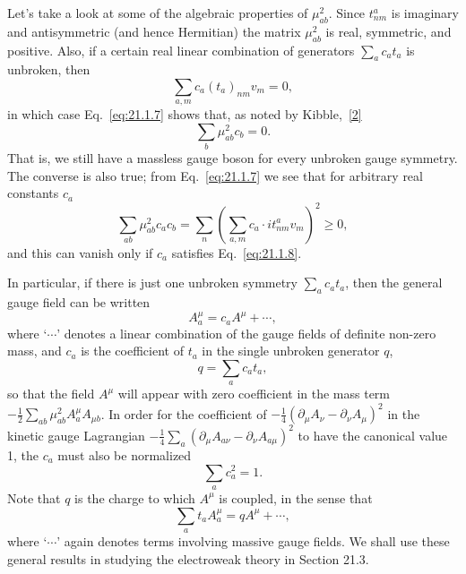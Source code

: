 Let's take a look at some of the algebraic properties of
$\mu^2_{ab}$. Since $t^a_{nm}$ is imaginary and antisymmetric
(and hence Hermitian) the matrix $\mu^2_{ab}$ is real, symmetric,
and positive. Also, if a certain real linear combination of generators
$\sum_a c_a t_a$ is unbroken, then
\begin{equation}
 \sum_{a,m}c_a(t_a)_{nm}v_m=0,
 \tag{21.1.8}\label{eq:21.1.8}
\end{equation}
in which case Eq.~\eqref{eq:21.1.7} shows that, as noted by
Kibble,~\hyperref[ch21-ref-2]{[2]}
\begin{equation}
 \sum_b\mu^2_{ab}c_b=0.
 \tag{21.1.9}\label{eq:21.1.9}
\end{equation}
That is, we still have a massless gauge boson for every unbroken gauge
symmetry. The converse is also true; from Eq.~\eqref{eq:21.1.7} we see that
for arbitrary real constants $c_a$
\begin{equation}
 \sum_{ab}\mu^2_{ab}c_a c_b
 =\sum_n\left(\sum_{a,m}
 c_a\cdot it^a_{nm}v_m\right)^2\geq 0,
 \tag{21.1.10}\label{eq:21.1.10}
\end{equation}
and this can vanish only if $c_a$ satisfies Eq.~\eqref{eq:21.1.8}.

In particular, if there is just one unbroken symmetry
$\sum_a c_a t_a$, then the general gauge field can be written
\begin{equation}
 A_a^\mu=c_a A^\mu+\cdots,
 \tag{21.1.11}\label{eq:21.1.11}
\end{equation}
where `$\cdots$' denotes a linear combination of the gauge fields of
definite non-zero mass, and $c_a$ is the coefficient of $t_a$ in
the single unbroken generator $q$,
\begin{equation}
 q=\sum_a c_a t_a,
 \tag{21.1.12}\label{eq:21.1.12}
\end{equation}
so that the field $A^\mu$ will appear with zero coefficient in the mass
term $-\frac12\sum_{ab}\mu^2_{ab}
A_a^\mu A_{\mu b}$. In order for the coefficient of
$-\frac14(\partial_\mu A_\nu\allowbreak-\partial_\nu A_\mu)^2$ in the kinetic gauge
Lagrangian
$-\frac14\sum_a(\partial_\mu A_{a\nu}
\allowbreak-\partial_\nu A_{a\mu})^2$ to have the canonical value 1, the
$c_a$ must also be normalized
\begin{equation}
 \sum_a c_a^2=1.
 \tag{21.1.13}\label{eq:21.1.13}
\end{equation}
Note that $q$ is the charge to which $A^\mu$ is coupled, in the sense that
\begin{equation}
 \sum_a t_a A_a^\mu=qA^\mu+\cdots,
 \tag{21.1.14}\label{eq:21.1.14}
\end{equation}
where `$\cdots$' again denotes terms involving massive gauge fields. We
shall use these general results in studying the electroweak theory in
Section 21.3.

